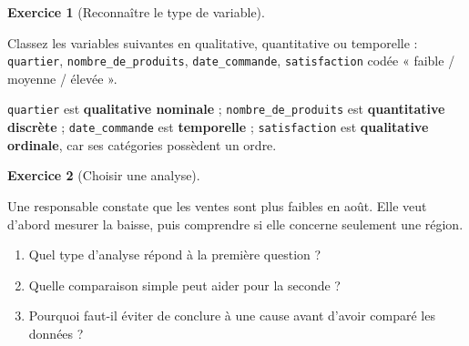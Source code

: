 \documentclass[
  french,
  letterpaper,
  open=any]{scrbook}
\providecommand{\tightlist}{%
  \setlength{\itemsep}{0pt}\setlength{\parskip}{0pt}}
\theoremstyle{definition}
\theoremstyle{definition}
\newtheorem{exercise}{Exercice}[section]
\theoremstyle{remark}
\begin{document}
\begin{exercise}[Reconnaître le type de
variable]\protect\hypertarget{exr-intro-ad-7}{}\label{exr-intro-ad-7}

Classez les variables suivantes en qualitative, quantitative ou
temporelle : \texttt{quartier}, \texttt{nombre\_de\_produits},
\texttt{date\_commande}, \texttt{satisfaction} codée « faible / moyenne
/ élevée ».

\end{exercise}

\begin{tcolorbox}[enhanced jigsaw, arc=.35mm, bottomrule=.15mm, bottomtitle=1mm, breakable, colback=white, colbacktitle=quarto-callout-tip-color!10!white, colframe=quarto-callout-tip-color-frame, coltitle=black, left=2mm, leftrule=.75mm, opacityback=0, opacitybacktitle=0.6, rightrule=.15mm, title=\textcolor{quarto-callout-tip-color}{\faLightbulb}\hspace{0.5em}{Solution de l'exercice Exercice~\ref{exr-intro-ad-7}}, titlerule=0mm, toprule=.15mm, toptitle=1mm]

\texttt{quartier} est \textbf{qualitative nominale} ;
\texttt{nombre\_de\_produits} est \textbf{quantitative discrète} ;
\texttt{date\_commande} est \textbf{temporelle} ; \texttt{satisfaction}
est \textbf{qualitative ordinale}, car ses catégories possèdent un
ordre.

\end{tcolorbox}

\begin{exercise}[Choisir une
analyse]\protect\hypertarget{exr-intro-ad-8}{}\label{exr-intro-ad-8}

Une responsable constate que les ventes sont plus faibles en août. Elle
veut d'abord mesurer la baisse, puis comprendre si elle concerne
seulement une région.

\begin{enumerate}
\def\labelenumi{\alph{enumi}.}
\tightlist
\item
  Quel type d'analyse répond à la première question ?
\item
  Quelle comparaison simple peut aider pour la seconde ?
\item
  Pourquoi faut-il éviter de conclure à une cause avant d'avoir comparé
  les données ?
\end{enumerate}

\end{exercise}
\end{document}
